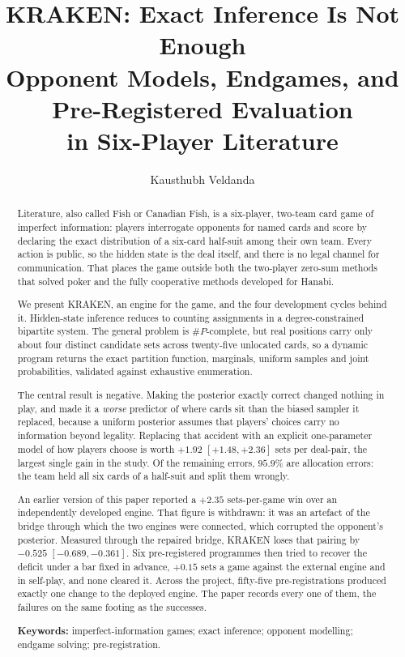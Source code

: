 \documentclass[11pt,letterpaper]{article}
\title{\bfseries KRAKEN: Exact Inference Is Not Enough\\[0.2em]
\large\bfseries Opponent Models, Endgames, and Pre-Registered Evaluation\\
\large\bfseries in Six-Player Literature}
\author{Kausthubh Veldanda}
\date{}
\begin{document}
\maketitle
\thispagestyle{fancy}

\begin{abstract}
\noindent
Literature, also called Fish or Canadian Fish, is a six-player, two-team card
game of imperfect information: players interrogate opponents for named cards
and score by declaring the exact distribution of a six-card half-suit among
their own team. Every action is public, so the hidden state is the deal itself,
and there is no legal channel for communication. That places the game outside
both the two-player zero-sum methods that solved poker and the fully
cooperative methods developed for Hanabi.

We present KRAKEN, an engine for the game, and the four development cycles
behind it. Hidden-state inference reduces to counting assignments in a
degree-constrained bipartite system. The general problem is $\#P$-complete, but
real positions carry only about four distinct candidate sets across
twenty-five unlocated cards, so a dynamic program returns the exact partition
function, marginals, uniform samples and joint probabilities, validated against
exhaustive enumeration.

The central result is negative. Making the posterior exactly correct changed
nothing in play, and made it a \emph{worse} predictor of where cards sit than
the biased sampler it replaced, because a uniform posterior assumes that
players' choices carry no information beyond legality. Replacing that accident
with an explicit one-parameter model of how players choose is worth $+1.92$
$[+1.48, +2.36]$ sets per deal-pair, the largest single gain in the study. Of
the remaining errors, $95.9\%$ are allocation errors: the team held all six
cards of a half-suit and split them wrongly.

An earlier version of this paper reported a $+2.35$ sets-per-game win over an
independently developed engine. That figure is withdrawn: it was an artefact of
the bridge through which the two engines were connected, which corrupted the
opponent's posterior. Measured through the repaired bridge, KRAKEN loses that
pairing by $-0.525$ $[-0.689, -0.361]$. Six pre-registered programmes then
tried to recover the deficit under a bar fixed in advance, $+0.15$ sets a game
against the external engine and in self-play, and none cleared it. Across the
project, fifty-five pre-registrations produced exactly one change to the
deployed engine. The paper records every one of them, the failures on the same
footing as the successes.

\vspace{2pt}
\noindent\textbf{Keywords:} imperfect-information games; exact inference; opponent modelling; endgame solving; pre-registration.
\end{abstract}
\end{document}

